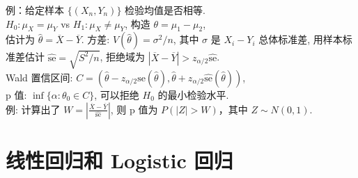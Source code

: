 \documentclass[titlepage, a4paper, landscape]{article}
\begin{document}
\begin{multicols}{4}
\newcolumn

例：给定样本 $\{(X_n, Y_n)\}$ 检验均值是否相等. \\
$H_0: \mu_X = \mu_Y$ vs $H_1: \mu_X \neq \mu_Y$, 构造 $\theta = \mu_1 - \mu_2$, \\
估计为 $\hat \theta = \overline X - \overline Y$.
方差: $V(\hat \theta) =  \sigma^2/n$, 其中 $\sigma$ 是 $X_i - Y_i$ 总体标准差, 用样本标准差估计
$\hat{\mathrm{se}} = \sqrt{S^2/n}$, 拒绝域为 $|\overline X - \overline Y| > z_{\alpha / 2} \hat {\mathrm{se}}$. \\
Wald 置信区间: $C = \left(\hat \theta - z_{\alpha / 2} \hat {\mathrm{se}}(\hat \theta), \hat \theta + z_{\alpha / 2} \hat {\mathrm{se}}(\hat \theta)\right)$, \\
p 值: $\inf \{\alpha : \theta_0 \in C\}$, 可以拒绝 $H_0$ 的最小检验水平. \\
例: 计算出了 $W = \left| \frac{\overline X - \overline Y}{\hat {\mathrm{se}}}\right|$, 则 p 值为 $P(|Z| > W)$，其中 $Z\sim N(0, 1)$.

\setcounter{section}{12}
\section{线性回归和 Logistic 回归}

\end{multicols}
	
\end{document}
